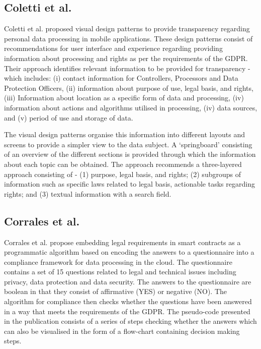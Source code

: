 \subsection*{Coletti et al.}
Coletti et al. \cite{kurosu_design_2019} proposed visual design patterns to provide transparency regarding personal data processing in mobile applications. These design patterns consist of recommendations for user interface and experience regarding providing information about processing and rights as per the requirements of the GDPR. Their approach identifies relevant information to be provided for transparency - which includes: (i) contact information for Controllers, Processors and Data Protection Officers, (ii) information about purpose of use, legal basis, and rights, (iii) Information about location as a specific form of data and processing, (iv) information about actions and algorithms utilised in processing, (iv) data sources, and (v) period of use and storage of data.

The visual design patterns organise this information into different layouts and screens to provide a simpler view to the data subject. A `springboard' consisting of an overview of the different sections is provided through which the information about each topic can be obtained. The approach recommends a three-layered approach consisting of - (1) purpose, legal basis, and rights; (2) subgroups of information such as specific laws related to legal basis, actionable tasks regarding rights; and (3) textual information with a search field.

\subsection*{Corrales et al.}
Corrales et al. \cite{corrales_smart_2019} propose embedding legal requirements in smart contracts as a programmatic algorithm based on encoding the answers to a questionnaire into a compliance framework for data processing in the cloud. The questionnaire contains a set of 15 questions related to legal and technical issues including privacy, data protection and data security. The answers to the questionnaire are boolean in that they consist of affirmative (YES) or negative (NO). The algorithm for compliance then checks whether the questions have been answered in a way that meets the requirements of the GDPR. The pseudo-code presented in the publication consists of a series of steps checking whether the answers which can also be visualised in the form of a flow-chart containing decision making steps.

